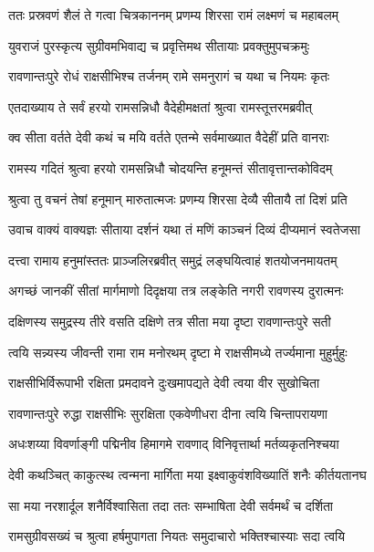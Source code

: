 
\twolineshloka
{ततः प्रस्रवणं शैलं ते गत्वा चित्रकाननम्}
{प्रणम्य शिरसा रामं लक्ष्मणं च महाबलम्} %

\twolineshloka
{युवराजं पुरस्कृत्य सुग्रीवमभिवाद्य च}
{प्रवृत्तिमथ सीतायाः प्रवक्तुमुपचक्रमुः} %

\twolineshloka
{रावणान्तःपुरे रोधं राक्षसीभिश्च तर्जनम्}
{रामे समनुरागं च यथा च नियमः कृतः} %

\twolineshloka
{एतदाख्याय ते सर्वं हरयो रामसन्निधौ}
{वैदेहीमक्षतां श्रुत्वा रामस्तूत्तरमब्रवीत्} %

\twolineshloka
{क्व सीता वर्तते देवी कथं च मयि वर्तते}
{एतन्मे सर्वमाख्यात वैदेहीं प्रति वानराः} %

\twolineshloka
{रामस्य गदितं श्रुत्वा हरयो रामसन्निधौ}
{चोदयन्ति हनूमन्तं सीतावृत्तान्तकोविदम्} %

\twolineshloka
{श्रुत्वा तु वचनं तेषां हनूमान् मारुतात्मजः}
{प्रणम्य शिरसा देव्यै सीतायै तां दिशं प्रति} %

\twolineshloka
{उवाच वाक्यं वाक्यज्ञः सीताया दर्शनं यथा}
{तं मणिं काञ्चनं दिव्यं दीप्यमानं स्वतेजसा} %

\twolineshloka
{दत्त्वा रामाय हनुमांस्ततः प्राञ्जलिरब्रवीत्}
{समुद्रं लङ्घयित्वाहं शतयोजनमायतम्} %

\twolineshloka
{अगच्छं जानकीं सीतां मार्गमाणो दिदृक्षया}
{तत्र लङ्केति नगरी रावणस्य दुरात्मनः} %

\twolineshloka
{दक्षिणस्य समुद्रस्य तीरे वसति दक्षिणे}
{तत्र सीता मया दृष्टा रावणान्तःपुरे सती} %

\twolineshloka
{त्वयि सन्न्यस्य जीवन्ती रामा राम मनोरथम्}
{दृष्टा मे राक्षसीमध्ये तर्ज्यमाना मुहुर्मुहुः} %

\twolineshloka
{राक्षसीभिर्विरूपाभी रक्षिता प्रमदावने}
{दुःखमापद्यते देवी त्वया वीर सुखोचिता} %

\twolineshloka
{रावणान्तःपुरे रुद्धा राक्षसीभिः सुरक्षिता}
{एकवेणीधरा दीना त्वयि चिन्तापरायणा} %

\twolineshloka
{अधःशय्या विवर्णाङ्गी पद्मिनीव हिमागमे}
{रावणाद् विनिवृत्तार्था मर्तव्यकृतनिश्चया} %

\twolineshloka
{देवी कथञ्चित् काकुत्स्थ त्वन्मना मार्गिता मया}
{इक्ष्वाकुवंशविख्यातिं शनैः कीर्तयतानघ} %

\twolineshloka
{सा मया नरशार्दूल शनैर्विश्वासिता तदा}
{ततः सम्भाषिता देवी सर्वमर्थं च दर्शिता} %

\twolineshloka
{रामसुग्रीवसख्यं च श्रुत्वा हर्षमुपागता}
{नियतः समुदाचारो भक्तिश्चास्याः सदा त्वयि} %


